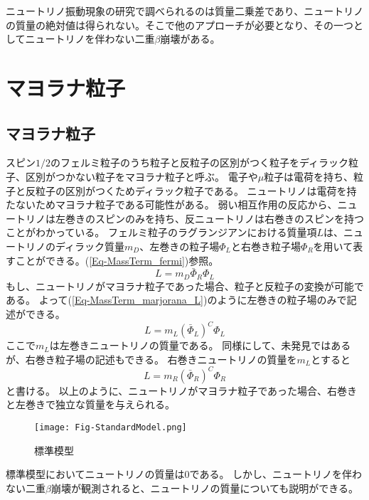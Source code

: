 \documentclass[a4paper,10pt]{jreport}
\begin{document}
ニュートリノ振動現象の研究で調べられるのは質量二乗差であり、ニュートリノの質量の絶対値は得られない。そこで他のアプローチが必要となり、その一つとしてニュートリノを伴わない二重$\beta$崩壊がある。



\section{マヨラナ粒子}



\subsection{マヨラナ粒子}

スピン$1/2$のフェルミ粒子のうち粒子と反粒子の区別がつく粒子をディラック粒子、区別がつかない粒子をマヨラナ粒子と呼ぶ。
電子や$\mu$粒子は電荷を持ち、粒子と反粒子の区別がつくためディラック粒子である。
ニュートリノは電荷を持たないためマヨラナ粒子である可能性がある。
弱い相互作用の反応から、ニュートリノは左巻きのスピンのみを持ち、反ニュートリノは右巻きのスピンを持つことがわかっている。
フェルミ粒子のラグランジアンにおける質量項$L$は、ニュートリノのディラック質量$m_D$、左巻きの粒子場$\Phi_L$と右巻き粒子場$\Phi_R$を用いて表すことができる。(\ref{Eq-MassTerm_fermi})参照。
\begin{equation} \label{Eq-MassTerm_fermi}
	L=m_D\bar{\Phi}_R\Phi_L
\end{equation}
もし、ニュートリノがマヨラナ粒子であった場合、粒子と反粒子の変換が可能である。
よって(\ref{Eq-MassTerm_marjorana_L})のように左巻きの粒子場のみで記述ができる。
\begin{equation} \label{Eq-MassTerm_marjorana_L}
	L=m_L(\bar{\Phi}_L)^C\Phi_L
\end{equation}
ここで$m_L$は左巻きニュートリノの質量である。
同様にして、未発見ではあるが、右巻き粒子場の記述もできる。
右巻きニュートリノの質量を$m_L$とすると
\begin{equation} \label{Eq-MassTerm_marjorana_R}
	L=m_R(\bar{\Phi}_R)^C\Phi_R
\end{equation}
と書ける。
以上のように、ニュートリノがマヨラナ粒子であった場合、右巻きと左巻きで独立な質量を与えられる。
\begin{figure}[H]
	\center
	\texttt{[image: Fig-StandardModel.png]}
	\caption{標準模型} \label{Fig-StandardModel}
\end{figure}
標準模型においてニュートリノの質量は0である。
しかし、ニュートリノを伴わない二重$\beta$崩壊が観測されると、ニュートリノの質量についても説明ができる。
\end{document}

